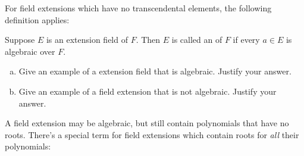 
For field extensions which have no transcendental elements, the following definition applies:

\begin{defn}\label{def:algfieldextension}  
Suppose $E$ is an extension field of $F$. Then $E$ is called an  of $F$ if every $a\in E$ is algebraic over $F$. %
 \end{defn}

\begin{exercise}{}
\begin{enumerate}[(a)]
\item
Give an example of a extension field that is algebraic. Justify your answer.
\item
Give an example of a field extension that is not algebraic. Justify your answer.
\end{enumerate}
\end{exercise}

A field extension may be algebraic, but still contain polynomials that have no roots. There's a special term for field extensions which contain roots for \emph{all} their polynomials:

